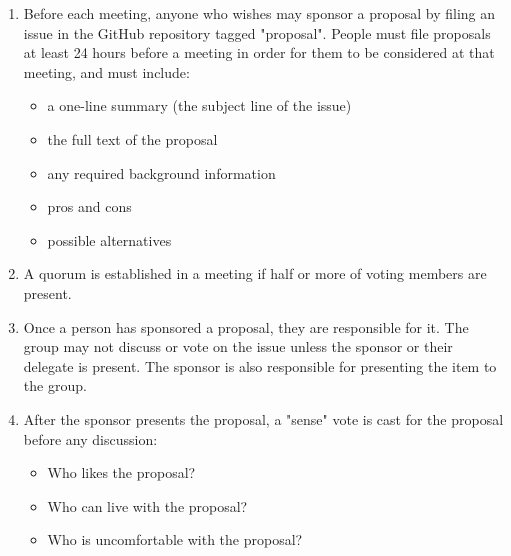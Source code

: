 \documentclass{scrbook}
\begin{document}
\begin{enumerate}

\item 

Before each meeting, anyone who wishes may sponsor a proposal by filing an
    issue in the GitHub repository tagged "proposal".  People must file proposals
    at least 24 hours before a meeting in order for them to be considered at that
    meeting, and must include:

\begin{itemize}

\item a one-line summary (the subject line of the issue)

\item the full text of the proposal

\item any required background information

\item pros and cons

\item possible alternatives

\end{itemize}



\item 

A quorum is established in a meeting if half or more of voting members are
    present.



\item 

Once a person has sponsored a proposal, they are responsible for it.  The
    group may not discuss or vote on the issue unless the sponsor or their
    delegate is present.  The sponsor is also responsible for presenting the
    item to the group.



\item 

After the sponsor presents the proposal, a "sense" vote is cast for the
    proposal before any discussion:

\begin{itemize}

\item Who likes the proposal?

\item Who can live with the proposal?

\item Who is uncomfortable with the proposal?


\end{itemize}
\end{enumerate}
\end{document}
